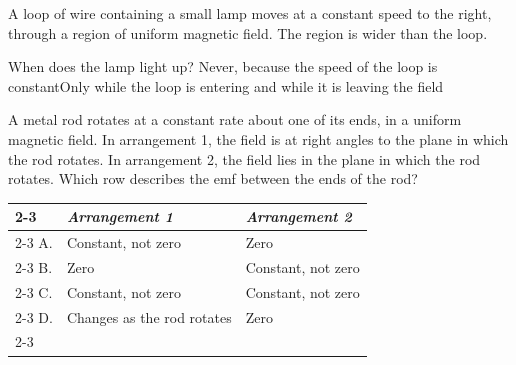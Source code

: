 \begin{quizq}{}
A loop of wire containing a small lamp moves at a constant speed to the right, through a region of
uniform magnetic field. The region is wider than the loop.
\begin{center}
\end{center}
When does the lamp light up?
  {Never, because the speed of the loop is constant}{Only while the loop is entering and while it is
  leaving the field}
\end{quizq}

\begin{quizq}{}
A metal rod rotates at a constant rate about one of its ends, in a uniform magnetic field. In
arrangement 1, the field is at right angles to the plane in which the rod rotates. In arrangement 2,
the field lies in the plane in which the rod rotates. Which row describes the emf between the ends of
the rod?
\begin{center}
  \renewcommand\arraystretch{1.7}
  \begin{tabular}{@{}p{10mm}|>{\centering\arraybackslash}p{50mm}|>{\centering\arraybackslash}p{50mm}|}
    \cline{2-3}
    & \textit{Arrangement 1} & \textit{Arrangement 2}\\ \cline{2-3}
    A. & Constant, not zero & Zero\\ \cline{2-3}
    B. & Zero & Constant, not zero\\ \cline{2-3}
    C. & Constant, not zero & Constant, not zero\\ \cline{2-3}
    D. & Changes as the rod rotates & Zero\\ \cline{2-3}
  \end{tabular}
\end{center}
\end{quizq}

